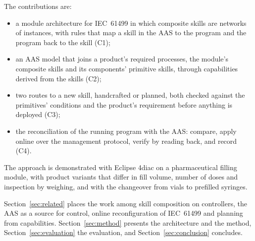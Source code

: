The contributions are:
\begin{itemize}
  \item a module architecture for IEC~61499 in which composite skills are networks of instances, with
    rules that map a skill in the AAS to the program and the program back to the skill (C1);
  \item an AAS model that joins a product's required processes, the module's composite skills and its
    components' primitive skills, through capabilities derived from the skills (C2);
  \item two routes to a new skill, handcrafted or planned, both checked against the primitives'
    conditions and the product's requirement before anything is deployed (C3);
  \item the reconciliation of the running program with the AAS: compare, apply online over the
    management protocol, verify by reading back, and record (C4).
\end{itemize}
The approach is demonstrated with Eclipse 4diac on a pharmaceutical
filling module, with product variants that differ in fill volume, number of doses and inspection by
weighing, and with the changeover from vials to prefilled syringes.

Section~\ref{sec:related} places the work among skill composition on controllers, the AAS as a source
for control, online reconfiguration of IEC~61499 and planning from capabilities.
Section~\ref{sec:method} presents the architecture and the method, Section~\ref{sec:evaluation} the
evaluation, and Section~\ref{sec:conclusion} concludes.
